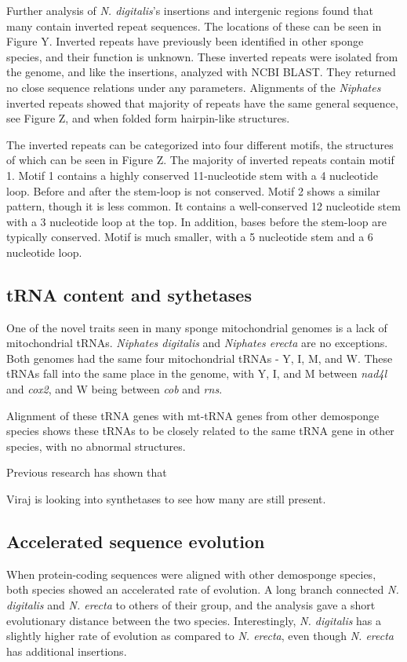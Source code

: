 \documentclass[../main.tex]{subfiles}
\begin{document}
Further analysis of \emph{N. digitalis}'s insertions and intergenic regions found that many contain inverted repeat sequences. The locations of these can be seen in Figure Y. Inverted repeats have previously been identified in other sponge species, and their function is unknown. These inverted repeats were isolated from the genome, and like the insertions, analyzed with NCBI BLAST. They returned no close sequence relations under any parameters. Alignments of the \emph{Niphates} inverted repeats showed that majority of repeats have the same general sequence, see Figure Z, and when folded form hairpin-like structures.

The inverted repeats can be categorized into four different motifs, the structures of which can be seen in Figure Z. The majority of inverted repeats contain motif 1. Motif 1 contains a highly conserved 11-nucleotide stem with a 4 nucleotide loop. Before and after the stem-loop is not conserved. Motif 2 shows a similar pattern, though it is less common. It contains a well-conserved 12 nucleotide stem with a 3 nucleotide loop at the top. In addition, bases before the stem-loop are typically conserved. Motif  is much smaller, with a 5 nucleotide stem and a 6 nucleotide loop. 

\subsection{tRNA content and sythetases}
One of the novel traits seen in many sponge mitochondrial genomes is a lack of mitochondrial tRNAs. \emph{Niphates digitalis} and \emph{Niphates erecta} are no exceptions. Both genomes had the same four mitochondrial tRNAs - Y, I, M, and W. These tRNAs fall into the same place in the genome, with Y, I, and M between \emph{nad4l} and \emph{cox2}, and W being between \emph{cob} and \emph{rns}.

Alignment of these tRNA genes with mt-tRNA genes from other demosponge species shows these tRNAs to be closely related to the same tRNA gene in other species, with no abnormal structures. 

Previous research has shown that 

Viraj is looking into synthetases to see how many are still present.

\subsection{Accelerated sequence evolution}
When protein-coding sequences were aligned with other demosponge species, both species showed an accelerated rate of evolution. A long branch connected \emph{N. digitalis} and \emph{N. erecta} to others of their group, and the analysis gave a short evolutionary distance between the two species. Interestingly, \emph{N. digitalis} has a slightly higher rate of evolution as compared to \emph{N. erecta}, even though \emph{N. erecta} has additional insertions.
\end{document}
